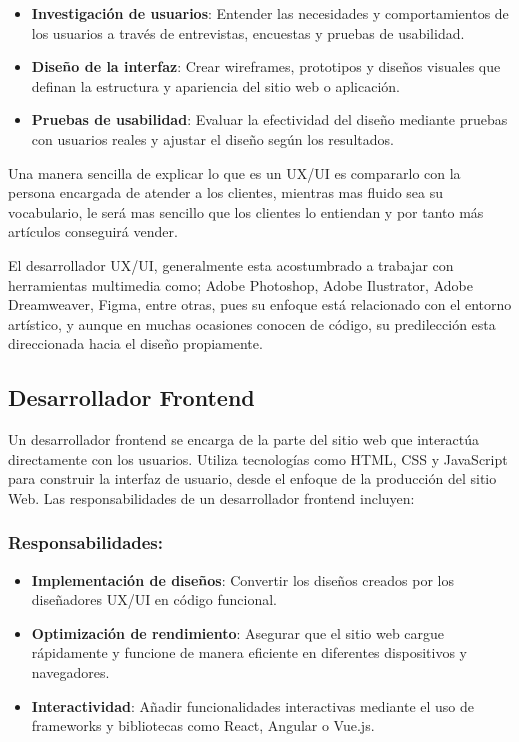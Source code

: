 \documentclass[
  letterpaper,
  DIV=11,
  numbers=noendperiod]{scrreprt}
\begin{document}
\begin{itemize}
\item
  \textbf{Investigación de usuarios}: Entender las necesidades y
  comportamientos de los usuarios a través de entrevistas, encuestas y
  pruebas de usabilidad.
\item
  \textbf{Diseño de la interfaz}: Crear wireframes, prototipos y diseños
  visuales que definan la estructura y apariencia del sitio web o
  aplicación.
\item
  \textbf{Pruebas de usabilidad}: Evaluar la efectividad del diseño
  mediante pruebas con usuarios reales y ajustar el diseño según los
  resultados.
\end{itemize}

Una manera sencilla de explicar lo que es un UX/UI es compararlo con la
persona encargada de atender a los clientes, mientras mas fluido sea su
vocabulario, le será mas sencillo que los clientes lo entiendan y por
tanto más artículos conseguirá vender.

El desarrollador UX/UI, generalmente esta acostumbrado a trabajar con
herramientas multimedia como; Adobe Photoshop, Adobe Ilustrator, Adobe
Dreamweaver, Figma, entre otras, pues su enfoque está relacionado con el
entorno artístico, y aunque en muchas ocasiones conocen de código, su
predilección esta direccionada hacia el diseño propiamente.

\subsection{\texorpdfstring{\textbf{Desarrollador
Frontend}}{Desarrollador Frontend}}\label{desarrollador-frontend}

Un desarrollador frontend se encarga de la parte del sitio web que
interactúa directamente con los usuarios. Utiliza tecnologías como HTML,
CSS y JavaScript para construir la interfaz de usuario, desde el enfoque
de la producción del sitio Web. Las responsabilidades de un
desarrollador frontend incluyen:

\subsubsection{Responsabilidades:}\label{responsabilidades}

\begin{itemize}
\item
  \textbf{Implementación de diseños}: Convertir los diseños creados por
  los diseñadores UX/UI en código funcional.
\item
  \textbf{Optimización de rendimiento}: Asegurar que el sitio web cargue
  rápidamente y funcione de manera eficiente en diferentes dispositivos
  y navegadores.
\item
  \textbf{Interactividad}: Añadir funcionalidades interactivas mediante
  el uso de frameworks y bibliotecas como React, Angular o Vue.js.
\end{itemize}
\end{document}

